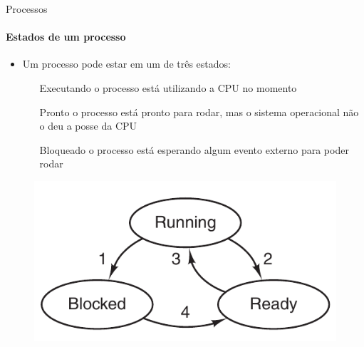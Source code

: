 \documentclass{beamer}
\begin{document}
\begin{frame}{Processos}
	\framesubtitle{Estados de um processo}
	\begin{itemize}
		\item Um processo pode estar em um de três estados:
		\begin{itemize}
			\item [Executando] o processo está utilizando a CPU no momento
			\item [Pronto] o processo está pronto para rodar, mas o sistema operacional não o deu a posse da CPU
			\item [Bloqueado] o processo está esperando algum evento externo para poder rodar
		\end{itemize}
	\end{itemize}
	\begin{figure}
		\includegraphics[width=0.5\paperwidth]{resources/states}
	\end{figure}
\end{frame}
\end{document}
